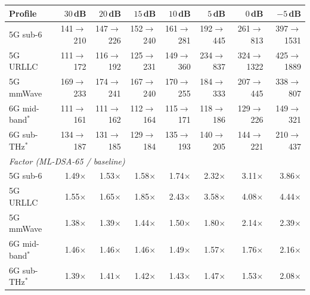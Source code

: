 \begin{tabular}{@{}lrrrrrrr@{}}
\toprule
Profile & $30$\,dB & $20$\,dB & $15$\,dB & $10$\,dB & $5$\,dB & $0$\,dB & $-5$\,dB \\
\midrule
5G sub-6 & 141$\to$210 & 147$\to$226 & 152$\to$240 & 161$\to$281 & 192$\to$445 & 261$\to$813 & 397$\to$1531 \\
5G URLLC & 111$\to$172 & 116$\to$192 & 125$\to$231 & 149$\to$360 & 234$\to$837 & 324$\to$1322 & 425$\to$1889 \\
5G mmWave & 169$\to$233 & 174$\to$241 & 167$\to$240 & 170$\to$255 & 184$\to$333 & 207$\to$445 & 338$\to$807 \\
6G mid-band$^\ast$ & 111$\to$161 & 111$\to$162 & 112$\to$164 & 115$\to$171 & 118$\to$186 & 129$\to$226 & 149$\to$321 \\
6G sub-THz$^\ast$ & 134$\to$187 & 131$\to$185 & 129$\to$184 & 135$\to$193 & 140$\to$205 & 144$\to$221 & 210$\to$437 \\
\midrule
\multicolumn{8}{l}{\textit{Factor (ML-DSA-65 / baseline)}} \\
5G sub-6 & 1.49$\times$ & 1.53$\times$ & 1.58$\times$ & 1.74$\times$ & 2.32$\times$ & 3.11$\times$ & 3.86$\times$ \\
5G URLLC & 1.55$\times$ & 1.65$\times$ & 1.85$\times$ & 2.43$\times$ & 3.58$\times$ & 4.08$\times$ & 4.44$\times$ \\
5G mmWave & 1.38$\times$ & 1.39$\times$ & 1.44$\times$ & 1.50$\times$ & 1.80$\times$ & 2.14$\times$ & 2.39$\times$ \\
6G mid-band$^\ast$ & 1.46$\times$ & 1.46$\times$ & 1.46$\times$ & 1.49$\times$ & 1.57$\times$ & 1.76$\times$ & 2.16$\times$ \\
6G sub-THz$^\ast$ & 1.39$\times$ & 1.41$\times$ & 1.42$\times$ & 1.43$\times$ & 1.47$\times$ & 1.53$\times$ & 2.08$\times$ \\
\bottomrule
\end{tabular}
